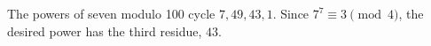 The powers of seven modulo 100 cycle $7,49,43,1$. Since $7^7\equiv3\pmod4$, the desired power has the third residue, $\boxed{43}$.
